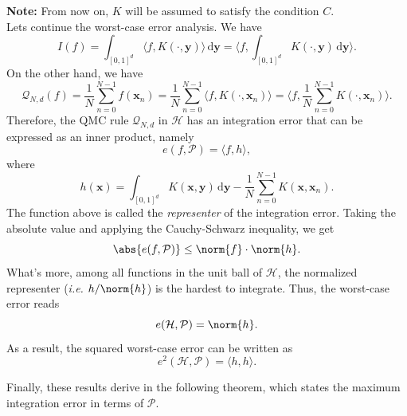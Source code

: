 \textbf{Note:} From now on, $K$ will be assumed to satisfy the condition \textbf{$C$}.\\

Lets continue the worst-case error analysis. We have
\begin{equation*}
    I(f) = \int_{[0,1]^d} \langle f,K(\cdot,\textbf{y}) \rangle \,\mathrm{d}\textbf{y} = \langle f,\int_{[0,1]^d} K(\cdot,\textbf{y}) \,\mathrm{d}\textbf{y} \rangle.
\end{equation*}
On the other hand, we have
\begin{equation*}
    \mathcal{Q}_{N,d}(f) = \frac{1}{N} \sum_{n=0}^{N-1} f(\textbf{x}_n) = \frac{1}{N} \sum_{n=0}^{N-1} \langle f,K(\cdot,\textbf{x}_n) \rangle = \langle f,\frac{1}{N} \sum_{n=0}^{N-1} K(\cdot,\textbf{x}_n) \rangle.
\end{equation*}
Therefore, the QMC rule $\mathcal{Q}_{N,d}$ in $\mathcal{H}$ has an integration error that can be expressed as an inner product, namely
\begin{equation*}
    e(f,\mathcal{P}) = \langle f,h \rangle,
\end{equation*}
where
\begin{equation*}
    h(\textbf{x}) = \int_{[0,1]^d} K(\textbf{x},\textbf{y}) \,\mathrm{d}\textbf{y} - \frac{1}{N} \sum_{n=0}^{N-1} K(\textbf{x},\textbf{x}_n).
\end{equation*}
The function above is called the \textit{representer} of the integration error. Taking the absolute value and applying the Cauchy-Schwarz inequality, we get
\begin{equation*}
    \abs{e(f,\mathcal{P})} \leq \norm{f} \cdot \norm{h}.
\end{equation*}
What's more, among all functions in the unit ball of $\mathcal{H}$, the normalized representer (\textit{i.e.} $h/\norm{h}$) is the hardest to integrate. Thus, the worst-case error reads
\begin{equation*}
    e(\mathcal{H},\mathcal{P}) = \norm{h}.
\end{equation*}
As a result, the squared worst-case error can be written as
\begin{equation*}
    e^2(\mathcal{H},\mathcal{P}) = \langle h,h \rangle.
\end{equation*}

\vspace{2mm}
Finally, these results derive in the following theorem, which states the maximum integration error in terms of $\mathcal{P}$.\\

